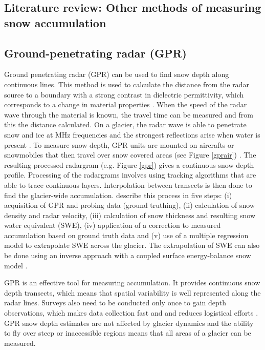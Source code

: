 \documentclass{sfuthesis}
\begin{document}
\begin{appendices}
\chapter{Literature review: Other methods of measuring snow accumulation }
\label{app:snow_measure_methods}

\section{Ground-penetrating radar (GPR)}

Ground penetrating radar (GPR) can be used to find snow depth along continuous lines. This method is used to calculate the distance from the radar source to a boundary with a strong contrast in dielectric permittivity, which corresponds to a change in material properties \citep{Sold2013}. When the speed of the radar wave through the material is known, the travel time can be measured and from this the distance calculated. On a glacier, the radar wave is able to penetrate snow and ice at MHz frequencies and the strongest reflections arise when water is present \citep{Sold2013}. To measure snow depth, GPR units are mounted on aircrafts or snowmobiles that then travel over snow covered areas (see Figure \ref{gprair}) \citep{Machguth2006, McGrath2015}. The resulting processed radargram (e.g. Figure \ref{gpr}) gives a continuous snow depth profile. Processing of the radargrams involves using tracking algorithms that are able to trace continuous layers. Interpolation between transects is then done to find the glacier-wide accumulation. \cite{McGrath2015} describe this process in five steps: (i) acquisition of GPR and probing data (ground truthing), (ii) calculation of snow density and radar velocity, (iii) calculation of snow thickness and resulting snow water equivalent (SWE), (iv) application of a correction to measured accumulation based on ground truth data and (v) use of a multiple regression model to extrapolate SWE across the glacier. The extrapolation of SWE can also be done using an inverse approach with a coupled surface energy-balance snow model \citep{Pelt2014}.

GPR is an effective tool for measuring accumulation. It provides continuous snow depth transects, which means that spatial variability is well represented along the radar lines. Surveys also need to be conducted only once to gain depth observations, which makes data collection fast and and reduces logistical efforts \citep{Machguth2006}. GPR snow depth estimates are not affected by glacier dynamics and the ability to fly over steep or inaccessible regions means that all areas of a glacier can be measured. 


\end{appendices}
\end{document}
